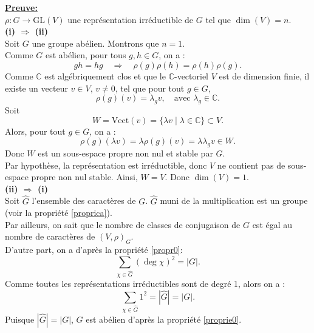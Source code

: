 \documentclass[a4paper, 14pt]{report}
\begin{document}
\begin{onehalfspace}
{\textbf{\underline{Preuve:}}\\
 \( \rho : G \to \mathrm{GL}(V) \) une représentation irréductible de \( G \) tel que \( \dim(V) = n \).\\
\textbf{(i) \(\Rightarrow\) (ii)}\\
Soit \( G \) une groupe abélien. Montrons que \(n=1\).\\
Comme \( G \) est abélien, pour tous \( g, h \in G \), on a :
\[
gh = hg \quad \Rightarrow \quad \rho(g)\rho(h) = \rho(h)\rho(g).
\]
Comme \( \mathbb{C} \) est algébriquement clos et que le \( \mathbb{C} \)-vectoriel \( V \) est de dimension finie, il existe un vecteur \( v \in V \), \( v \ne 0 \), tel que pour tout \( g \in G \),
\[
\rho(g)(v) = \lambda_g v, \quad \text{avec } \lambda_g \in \mathbb{C}.
\]
Soit
\[
W = \mathrm{Vect}(v) = \{ \lambda v \mid \lambda \in \mathbb{C} \} \subset V.
\]
Alors, pour tout \( g \in G \), on a :
\[
\rho(g)(\lambda v) = \lambda \rho(g)(v) = \lambda \lambda_g v \in W.
\]
Donc \( W \) est un sous-espace propre non nul et stable par \( G \).\\
Par hypothèse, la représentation est irréductible, donc \( V \) ne contient pas de sous-espace propre non nul stable.  
Ainsi, \( W = V \). Donc \( \dim(V) = 1 \).\\

\textbf{(ii) \(\Rightarrow\) (i)}\\ 
Soit \( \widehat{G} \) l’ensemble des caractères de \( G \).  
\( \widehat{G} \) muni de la multiplication est un groupe (voir la propriété \ref{proprica}).\\
Par ailleurs, on sait que le nombre de classes de conjugaison de \(G\) est égal au nombre de caractères de \((V,\rho)_{G}\).\\
D’autre part, on a d'après la propriété \ref{propr0}:
\[
\sum_{\chi \in \widehat{G}} (\deg \chi)^2 = |G|.
\]
Comme toutes les représentations irréductibles sont de degré 1, alors on a :
\[
\sum_{\chi \in \widehat{G}} 1^2 = |\widehat{G}| = |G|.
\]
Puisque \(|\widehat{G}| = |G|\), \( G \) est abélien d'après la propriété \ref{proprie0}.



}
\end{onehalfspace}
\end{document}
